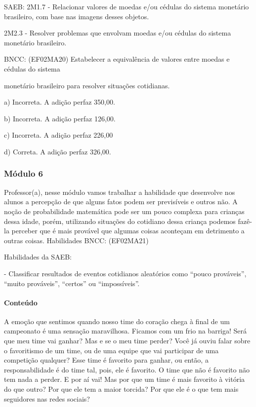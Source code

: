 SAEB: 2M1.7 - Relacionar valores de moedas e/ou cédulas do sistema
monetário brasileiro, com base nas imagens desses objetos.

2M2.3 - Resolver problemas que envolvam moedas e/ou cédulas do sistema
monetário brasileiro.

BNCC: (EF02MA20) Estabelecer a equivalência de valores entre moedas e
cédulas do sistema

monetário brasileiro para resolver situações cotidianas.

a) Incorreta. A adição perfaz 350,00.

b) Incorreta. A adição perfaz 126,00.

c) Incorreta. A adição perfaz 226,00

d) Correta. A adição perfaz 326,00.

\subsubsection{Módulo 6 }\label{muxf3dulo-6}

Professor(a), nesse módulo vamos trabalhar a habilidade que desenvolve
nos alunos a percepção de que alguns fatos podem ser previsíveis e
outros não. A noção de probabilidade matemática pode ser um pouco
complexa para crianças dessa idade, porém, utilizando situações do
cotidiano dessa criança podemos fazê-la perceber que é mais provável que
algumas coisas aconteçam em detrimento a outras coisas. Habilidades
BNCC: (EF02MA21)

Habilidades da SAEB:

- Classificar resultados de eventos cotidianos aleatórios como ``pouco
prováveis'', ``muito prováveis'', ``certos'' ou ``impossíveis''.

\paragraph{Conteúdo}\label{conteuxfado-5}

A emoção que sentimos quando nosso time do coração chega à final de um
campeonato é uma sensação maravilhosa. Ficamos com um frio na barriga!
Será que meu time vai ganhar? Mas e se o meu time perder? Você já ouviu
falar sobre o favoritismo de um time, ou de uma equipe que vai
participar de uma competição qualquer? Esse time é favorito para ganhar,
ou então, a responsabilidade é do time tal, pois, ele é favorito. O time
que não é favorito não tem nada a perder. E por aí vai! Mas por que um
time é mais favorito à vitória do que outro? Por que ele tem a maior
torcida? Por que ele é o que tem mais seguidores nas redes sociais?

